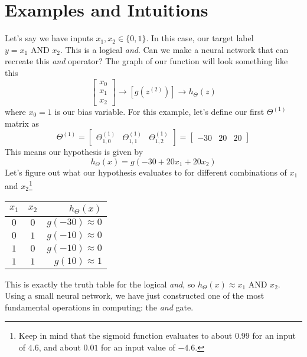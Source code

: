 \section{Examples and Intuitions}
Let's say we have inputs $x_1, x_2 \in \{0, 1\}$. In this case, our target label $y = x_1 \text{ AND } x_2$. This is a logical \textit{and}. Can we make a neural network that can recreate this \textit{and} operator? The graph of our function will look something like this
$$
\left[\begin{array}{c} x_0 \\ x_1 \\ x_2 \end{array}\right] \to \left[g\left(z^{(2)}\right)\right] \to h_\Theta\left(z\right)
$$
where $x_0 = 1$ is our bias variable. For this example, let's define our first $\Theta^{(1)}$ matrix as
$$
\Theta^{(1)} = \left[\begin{array}{ccc}\Theta_{1,0}^{(1)} & \Theta_{1,1}^{(1)} & \Theta_{1,2}^{(1)} \end{array}\right] = \left[\begin{array}{ccc}-30 & 20 & 20 \end{array}\right]
$$
This means our hypothesis is given by 
$$
h_\Theta\left(x\right) = g\left(	-30 + 20x_1 + 20x_2	\right)
$$
Let's figure out what our hypothesis evaluates to for different combinations of $x_1$ and $x_2$\footnote{Keep in mind that the sigmoid function evaluates to about $0.99$ for an input of $4.6$, and about $0.01$ for an input value of $-4.6$.}

\begin{center}
\begin{tabular}{c c | r}
$x_1$ & $x_2$ & $h_\Theta\left(x\right)$ \\
\hline
$0$ & $0$ & $g\left(-30\right) \approx 0$ \\
$0$ & $1$ & $g\left(-10\right) \approx 0$ \\
$1$ & $0$ & $g\left(-10\right) \approx 0$ \\
$1$ & $1$ & $g\left(10\right) \approx 1$
\end{tabular}
\end{center}

This is exactly the truth table for the logical \textit{and}, so $h_\Theta\left(x\right) \approx x_1 \text{ AND } x_2$. Using a small neural network, we have just constructed one of the most fundamental operations in computing: the \textit{and} gate. 

